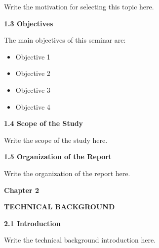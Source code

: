 \documentclass[12pt]{article}
\begin{document}
Write the motivation for selecting this topic here.

\vspace{0.5cm}

\noindent
\textbf{1.3 Objectives}

\vspace{0.25cm}

The main objectives of this seminar are:

\vspace{0.2cm}

\begin{itemize}
\item Objective 1
\item Objective 2
\item Objective 3
\item Objective 4
\end{itemize}

\vspace{0.5cm}

\noindent
\textbf{1.4 Scope of the Study}

\vspace{0.25cm}

Write the scope of the study here.

\vspace{0.5cm}

\noindent
\textbf{1.5 Organization of the Report}

\vspace{0.25cm}

Write the organization of the report here.

\newpage

\begin{center}
\textbf{\Large Chapter 2}
\end{center}

\vspace{0.4cm}

\begin{center}
\textbf{\Large TECHNICAL BACKGROUND}
\end{center}

\vspace{0.6cm}

\noindent
\textbf{2.1 Introduction}

\vspace{0.25cm}

Write the technical background introduction here.
\end{document}
